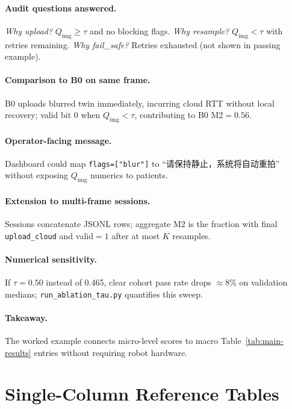 \paragraph{Audit questions answered.}
\textit{Why upload?} $Q_{\mathrm{img}}\geq\tau$ and no blocking flags.
\textit{Why resample?} $Q_{\mathrm{img}}<\tau$ with retries remaining.
\textit{Why fail\_safe?} Retries exhausted (not shown in passing example).

\paragraph{Comparison to B0 on same frame.}
B0 uploads blurred twin immediately, incurring cloud RTT without local recovery; valid bit 0 when $Q_{\mathrm{img}}<\tau$, contributing to B0 M2$=0.56$.

\paragraph{Operator-facing message.}
Dashboard could map \texttt{flags=["blur"]} to ``请保持静止，系统将自动重拍'' without exposing $Q_{\mathrm{img}}$ numerics to patients.

\paragraph{Extension to multi-frame sessions.}
Sessions concatenate JSONL rows; aggregate M2 is the fraction with final \texttt{upload\_cloud} and valid$=1$ after at most $K$ resamples.

\paragraph{Numerical sensitivity.}
If $\tau{=}0.50$ instead of 0.465, clear cohort pass rate drops $\approx$8\% on validation medians; \texttt{run\_ablation\_tau.py} quantifies this sweep.

\paragraph{Takeaway.}
The worked example connects micro-level scores to macro Table~\ref{tab:main-results} entries without requiring robot hardware.

\onecolumn
\section{Single-Column Reference Tables}
\label{sec:onecol-tables}

